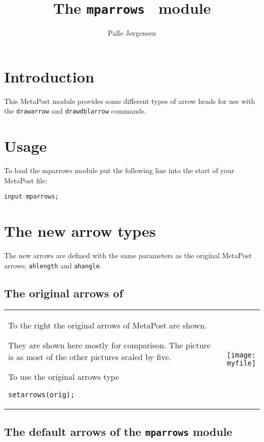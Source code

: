 \documentclass[paper=a4,11pt,UKenglish,DIV=calc,BCOR=0mm,parskip=half,fleqn]{scrartcl}
\author{Palle J\o rgensen} %
\title{The \texttt{mparrows} \MP\ module\quad \raisebox{-1ex}{\texttt{[image: mparrowsexamples2.mps]}}} %
\makeatletter
\newenvironment{example}[1]{%
  \def\myfile{#1}
  \begin{tabular}{@{}p{.67\linewidth-\tabcolsep}p{.33\linewidth}@{}}
    \begin{minipage}[c]{\linewidth}}{%
    \end{minipage}
    &\parbox[c]{\linewidth}{\centering\texttt{[image: \\myfile]}}
  \end{tabular}}
\makeatother
\begin{document}
\maketitle

\tableofcontents
\clearpage

\section{Introduction}
\label{sec:introduction}

This MetaPost module provides some different types of arrow heads for
use with the \lstinline{drawarrow} and \lstinline{drawdblarrow}
commands.

\section{Usage}
\label{sec:usage}

To load the mparrows module put the following line into the start of
your MetaPost file:
\begin{lstlisting}
input mparrows;
\end{lstlisting}

\section{The new arrow types}
\label{sec:new-arrow-types}

The new arrows are defined with the same parameters as the original
MetaPost arrows; \lstinline{ahlength} and \lstinline{ahangle}.

\subsection{The original arrows of \MP}
\label{sec:original-arrows-of-mp}

\begin{example}{mparrowsexamples0.mps}
  To the right the original arrows of MetaPost are shown.

  They are shown here mostly for comparison. The picture is as most of
  the other pictures scaled by five.

  To use the original arrows type
\begin{lstlisting}
setarrows(orig);
\end{lstlisting}
\end{example}

\subsection{The default arrows of the \texttt{mparrows} module}
\label{sec:stand-arrows-mparrows}
\end{document}
